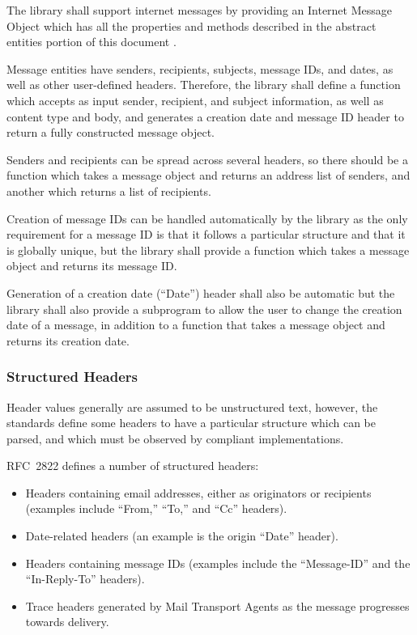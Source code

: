 \documentclass[11pt]{article}
\begin{document}
The library shall support internet messages by providing an Internet
Message Object which has all the properties and methods described in
the abstract entities portion of this document
.

Message entities have senders, recipients, subjects, message IDs, and
dates, as well as other user-defined headers. Therefore, the library
shall define a function which accepts as input sender, recipient,
and subject information, as well as content type and body, and
generates a creation date and message ID header to return a fully
constructed message object.

Senders and recipients can be spread across several headers, so there
should be a function which takes a message object and returns an
address list of senders, and another which returns a list of
recipients. 

Creation of message IDs can be handled automatically by the library
as the only requirement for a message ID is that it follows a
particular structure and that it is globally unique, but the
library shall provide a function which takes a message object and
returns its message ID. 

Generation of a creation date (``Date'') header shall also be
automatic but the library shall also provide a subprogram to allow the
user to change the creation date of a message, in addition to a
function that takes a message object and returns its creation date.

\subsubsection{Structured Headers}
\label{pi:headers:structured}

Header values generally are assumed to be unstructured text, however,
the standards define some headers to have a particular structure which
can be parsed, and which must be observed by compliant implementations.

RFC~2822 defines a number of structured headers:

\begin{itemize}

\item Headers containing email addresses, either as originators or
  recipients (examples include ``From,'' ``To,'' and ``Cc'' headers). 

\item Date-related headers (an example is the origin ``Date'' header). 

\item Headers containing message IDs (examples include the
  ``Message-ID'' and the ``In-Reply-To'' headers).

\item Trace headers generated by Mail Transport Agents as the message
  progresses towards delivery.

\end{itemize}
\end{document}
